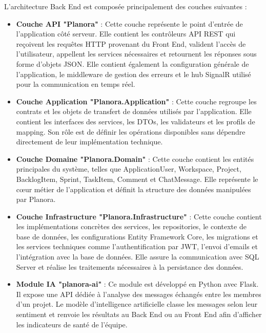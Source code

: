 L'architecture Back End est composée principalement des couches suivantes :
\begin{itemize}
  \item[$\bullet$] \textbf{Couche \ac{API} "Planora"} : Cette couche représente le point d'entrée de l'application côté serveur. Elle contient les contrôleurs \ac{API} REST qui reçoivent les requêtes HTTP provenant du Front End, valident l'accès de l'utilisateur, appellent les services nécessaires et retournent les réponses sous forme d'objets \ac{JSON}. Elle contient également la configuration générale de l'application, le middleware de gestion des erreurs et le hub \ac{SignalR} utilisé pour la communication en temps réel.

  \item[$\bullet$] \textbf{Couche Application "Planora.Application"} : Cette couche regroupe les contrats et les objets de transfert de données utilisés par l'application. Elle contient les interfaces des services, les DTOs, les validateurs et les profils de mapping. Son rôle est de définir les opérations disponibles sans dépendre directement de leur implémentation technique.

  \item[$\bullet$] \textbf{Couche Domaine "Planora.Domain"} : Cette couche contient les entités principales du système, telles que ApplicationUser, Workspace, Project, BacklogItem, Sprint, TaskItem, Comment et ChatMessage. Elle représente le cœur métier de l'application et définit la structure des données manipulées par Planora.

  \item[$\bullet$] \textbf{Couche Infrastructure "Planora.Infrastructure"} : Cette couche contient les implémentations concrètes des services, les repositories, le contexte de base de données, les configurations Entity Framework Core, les migrations et les services techniques comme l'authentification par \ac{JWT}, l'envoi d'emails et l'intégration avec la base de données. Elle assure la communication avec SQL Server et réalise les traitements nécessaires à la persistance des données.

  \item[$\bullet$] \textbf{Module IA "planora-ai"} : Ce module est développé en Python avec Flask. Il expose une API dédiée à l'analyse des messages échangés entre les membres d'un projet. Le modèle d'intelligence artificielle classe les messages selon leur sentiment et renvoie les résultats au Back End ou au Front End afin d'afficher les indicateurs de santé de l'équipe.
\end{itemize}

